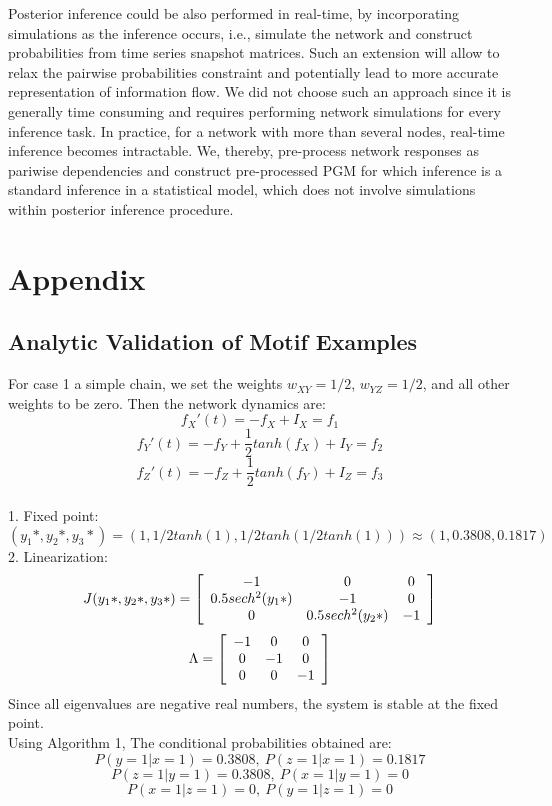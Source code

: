 \documentclass[letterpaper,11pt]{article}
\newcommand\tab[1][6mm]{\hspace*{#1}}
\newenvironment{mat}{\left[\begin{array}{ccccccccccccccc}}{\end{array}\right]}
\newcommand\bcm{\begin{mat}}
\newcommand\ecm{\end{mat}}
\begin{document}
Posterior inference could be also performed in real-time, by incorporating simulations as the inference occurs, i.e., simulate the network and construct probabilities from time series snapshot matrices. Such an extension will allow to relax the pairwise probabilities constraint and potentially lead to more accurate representation of information flow. We did not choose such an approach since it is generally time consuming and requires performing network simulations for every inference task. In practice, for a network with more than several nodes, real-time inference becomes intractable. We, thereby,  pre-process network responses as pariwise dependencies and construct pre-processed PGM for which inference is a standard inference in a statistical model, which does not involve simulations within posterior inference procedure.

\section{Appendix}
\subsection{Analytic Validation of Motif Examples }
\tab For case 1 a simple chain, we set the weights $w_{XY}=1/2$, $w_{YZ}=1/2$, and all other weights to be zero. Then the network dynamics are:
\[f_X'(t)=-f_X+I_X =f_1\]
\[f_Y'(t)=-f_Y+\frac{1}{2}tanh(f_X)+I_Y=f_2\]
\[f_Z'(t)=-f_Z+\frac{1}{2}tanh(f_Y)+I_Z=f_3\]
\\
1. Fixed point: \[(y_1*,y_2*,y_3*)=(1, 1/2tanh(1), 1/2tanh(1/2tanh(1)))\approx (1, 0.3808, 0.1817)\]
2. Linearization: \[J(y_1*,y_2*,y_3*)=\bcm -1&0&0\\0.5sech^2(y_1*)&-1&0\\0&0.5sech^2(y_2*)&-1\ecm\] 
\[\Lambda=\bcm -1&0&0\\0&-1&0\\0&0&-1\ecm\]
Since all eigenvalues are negative real numbers, the system is stable at the fixed point.\\
Using Algorithm 1, The conditional probabilities obtained are:
\[P(y=1|x=1)=0.3808,\ P(z=1|x=1)=0.1817\]
\[P(z=1|y=1)=0.3808,\ P(x=1|y=1)=0\]
\[P(x=1|z=1)=0,\ P(y=1|z=1)=0\]
\end{document}
